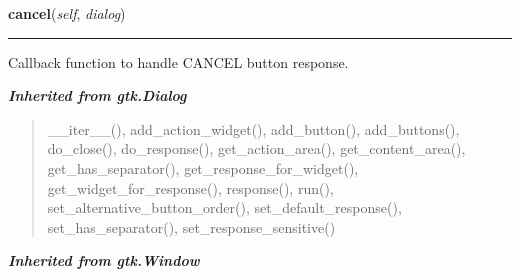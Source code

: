     \vspace{0.5ex}

\hspace{.8\funcindent}\begin{boxedminipage}{\funcwidth}

    \raggedright \textbf{cancel}(\textit{self}, \textit{dialog})

    \vspace{-1.5ex}

    \rule{\textwidth}{0.5\fboxrule}
\setlength{\parskip}{2ex}
    Callback function to handle CANCEL button response.

\setlength{\parskip}{1ex}
    \end{boxedminipage}


\large{\textbf{\textit{Inherited from gtk.Dialog}}}

\begin{quote}
\_\_iter\_\_(), add\_action\_widget(), add\_button(), add\_buttons(), do\_close(), do\_response(), get\_action\_area(), get\_content\_area(), get\_has\_separator(), get\_response\_for\_widget(), get\_widget\_for\_response(), response(), run(), set\_alternative\_button\_order(), set\_default\_response(), set\_has\_separator(), set\_response\_sensitive()
\end{quote}

\large{\textbf{\textit{Inherited from gtk.Window}}}

